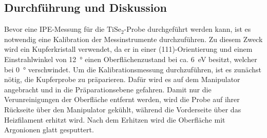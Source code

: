 \subsection{Durchführung und Diskussion}

Bevor eine IPE-Messung für die $\text{TiSe}_2$-Probe durchgeführt werden kann, ist es notwendig eine Kalibration der Messinstrumente durchzuführen.
Zu diesem Zweck wird ein Kupferkristall verwendet, da er in einer (111)-Orientierung und einem Einstrahlwinkel von \SI{12}{\degree} einen Oberflächenzustand bei ca. \SI{6}{\electronvolt} besitzt, welcher bei \SI{0}{\degree} verschwindet.
Um die Kalibrationsmessung durchzuführen, ist es zunächst nötig, die Kupferprobe zu präparieren.
Dafür wird es auf dem Manipulator angebracht und in die Präparationsebene gefahren.
Damit nur die Verunreinigungen der Oberfläche entfernt werden, wird die Probe auf ihrer Rückseite über den Manipulator gekühlt, während die Vorderseite über das Heizfilament erhitzt wird. %
Nach dem Erhitzen wird die Oberfläche mit Argonionen glatt gesputtert.

